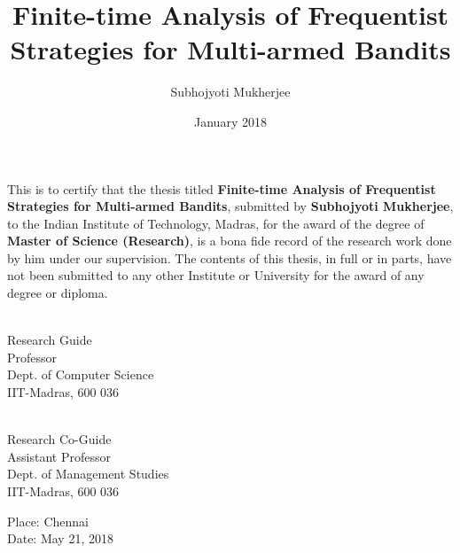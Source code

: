 \documentclass[MS,twoside]{iitmdiss}
\newcommand{\clearemptydoublepage}{\newpage{\cleardoublepage}}
\begin{document}

\title{Finite-time Analysis of Frequentist Strategies for Multi-armed Bandits}

\author{Subhojyoti Mukherjee}

\date{January 2018}

\maketitle



\clearemptydoublepage
\certificate

\vspace*{0.5in}

\noindent This is to certify that the thesis titled {\bf Finite-time Analysis of Frequentist Strategies for Multi-armed Bandits}, submitted by {\bf Subhojyoti Mukherjee}, 
  to the Indian Institute of Technology, Madras, for
the award of the degree of {\bf Master of Science (Research)}, is a bona fide
record of the research work done by him under our supervision.  The
contents of this thesis, in full or in parts, have not been submitted
to any other Institute or University for the award of any degree or
diploma.

\vspace*{1.5in}

\begin{singlespacing}
\hspace*{-0.25in}
\parbox{2.5in}{
 \\
\noindent Research Guide \\ 
\noindent Professor \\
\noindent Dept. of Computer Science\\
\noindent IIT-Madras, 600 036 \\
} 
\hspace*{1.0in} 
\parbox{2.5in}{
 \\
\noindent Research Co-Guide \\ 
\noindent Assistant Professor \\
\noindent Dept.  of  Management Studies\\
\noindent IIT-Madras, 600 036 \\
}  
\end{singlespacing}
\vspace*{0.25in}
\noindent Place: Chennai\\
Date: May 21, 2018
\end{document}
